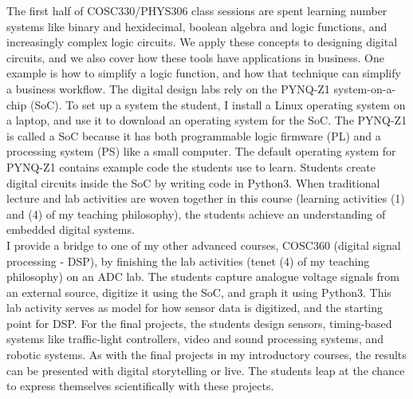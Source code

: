 \documentclass[../../../main.tex]{subfiles}
\begin{document}
\vspace{0.25cm}
The first half of COSC330/PHYS306 class sessions are spent learning number systems like binary and hexidecimal, boolean algebra and logic functions, and increasingly complex logic circuits.  We apply these concepts to designing digital circuits, and we also cover how these tools have applications in business.  One example is how to simplify a logic function, and how that technique can simplify a business workflow.  The digital design labs rely on the PYNQ-Z1 system-on-a-chip (SoC).  To set up a system the student, I install a Linux operating system on a laptop, and use it to download an operating system for the SoC.  The PYNQ-Z1 is called a SoC because it has both programmable logic firmware (PL) and a processing system (PS) like a small computer.  The default operating system for PYNQ-Z1 contains example code the students use to learn.  Students create digital circuits inside the SoC by writing code in Python3.  When traditional lecture and lab activities are woven together in this course (learning activities (1) and (4) of my teaching philosophy), the students achieve an understanding of embedded digital systems.
\\
\vspace{0.25cm}
I provide a bridge to one of my other advanced courses, COSC360 (digital signal processing - DSP), by finishing the lab activities (tenet (4) of my teaching philosophy) on an ADC lab.  The students capture analogue voltage signals from an external source, digitize it using the SoC, and graph it using Python3.  This lab activity serves as model for how sensor data is digitized, and the starting point for DSP.  For the final projects, the students design sensors, timing-based systems like traffic-light controllers, video and sound processing systems, and robotic systems.  As with the final projects in my introductory courses, the results can be presented with digital storytelling or live.  The students leap at the chance to express themselves scientifically with these projects.
\\
\vspace{0.25cm}
\end{document}
